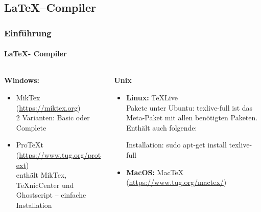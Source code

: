 \subsection{\LaTeX --Compiler}
\begin{frame}
\frametitle{Einf\"uhrung}
\framesubtitle{\LaTeX - Compiler}
\begin{columns}[t]
\begin{column}{.4\textwidth}
\textbf{Windows:}\\
\begin{itemize}
  \item MikTex (\url{https://miktex.org})\\
   2 Varianten: Basic oder Complete
  \item ProTeXt (\url{https://www.tug.org/protext})\\ 
   enthält MikTex, TeXnicCenter und Ghostscript – einfache Installation\\
\end{itemize}
\end{column}
\begin{column}{.6\textwidth}
\textbf{Unix}
\begin{itemize}
  \item \textbf{Linux:} TeXLive\\
Pakete unter Ubuntu: {\ttfamily texlive-full} ist das Meta-Paket mit allen
ben\"otigten Paketen. Enthält auch folgende:
Installation: {\ttfamily sudo apt-get install texlive-full}
\item \textbf{MacOS:} MacTeX (\url{https://www.tug.org/mactex/})\\
\end{itemize}
\end{column}
\end{columns}
\end{frame}



